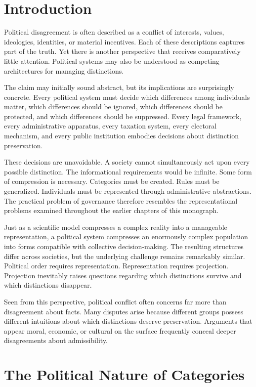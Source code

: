 \documentclass[11pt,oneside,openany]{book}
\begin{document}
\section{Introduction}

Political disagreement is often described as a conflict of interests, values, ideologies, identities, or material incentives. Each of these descriptions captures part of the truth. Yet there is another perspective that receives comparatively little attention. Political systems may also be understood as competing architectures for managing distinctions.

The claim may initially sound abstract, but its implications are surprisingly concrete. Every political system must decide which differences among individuals matter, which differences should be ignored, which differences should be protected, and which differences should be suppressed. Every legal framework, every administrative apparatus, every taxation system, every electoral mechanism, and every public institution embodies decisions about distinction preservation.

These decisions are unavoidable. A society cannot simultaneously act upon every possible distinction. The informational requirements would be infinite. Some form of compression is necessary. Categories must be created. Rules must be generalized. Individuals must be represented through administrative abstractions. The practical problem of governance therefore resembles the representational problems examined throughout the earlier chapters of this monograph.

Just as a scientific model compresses a complex reality into a manageable representation, a political system compresses an enormously complex population into forms compatible with collective decision-making. The resulting structures differ across societies, but the underlying challenge remains remarkably similar. Political order requires representation. Representation requires projection. Projection inevitably raises questions regarding which distinctions survive and which distinctions disappear.

Seen from this perspective, political conflict often concerns far more than disagreement about facts. Many disputes arise because different groups possess different intuitions about which distinctions deserve preservation. Arguments that appear moral, economic, or cultural on the surface frequently conceal deeper disagreements about admissibility.

\section{The Political Nature of Categories}
\end{document}
